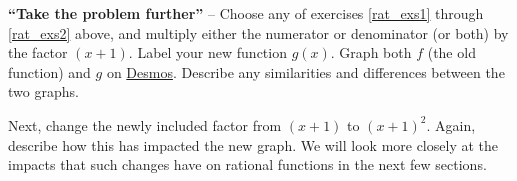 \documentclass[12pt]{book}
\theoremstyle{definition}
\newcommand{\Desmos}{\href{https://www.desmos.com/}{Desmos}}
\begin{document}
\textbf{``Take the problem further''} -- Choose any of exercises \ref{rat_exs1} through \ref{rat_exs2} above, and multiply either the numerator or denominator (or both) by the factor $(x+1)$.  Label your new function $g(x)$.  Graph both $f$ (the old function) and $g$ on \Desmos.  Describe any similarities and differences between the two graphs.
\par
Next, change the newly included factor from $(x+1)$ to $(x+1)^2$.  Again, describe how this has impacted the new graph.  We will look more closely at the impacts that such changes have on rational functions in the next few sections.
\end{document}
